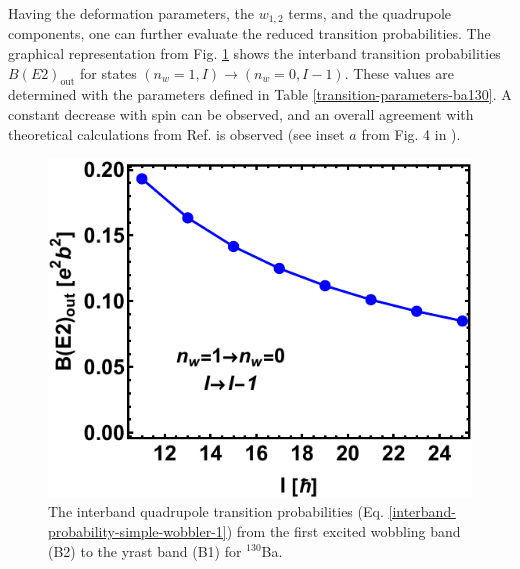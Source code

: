 Having the deformation parameters, the $w_{1,2}$ terms, and the quadrupole components, one can further evaluate the reduced transition probabilities. The graphical representation from Fig. \ref{BE2out-transitions-130ba} shows the interband transition probabilities $B(E2)_\text{out}$ for states $(n_w=1,I)\to(n_w=0,I-1)$. These values are determined with the parameters defined in Table \ref{transition-parameters-ba130}. A constant decrease with spin can be observed, and an overall agreement with theoretical calculations from Ref. \cite{chen2019transverse} is observed (see inset $a$ from Fig. 4 in \cite{chen2019transverse}).
\begin{figure}
    \centering
    \includegraphics[scale=0.8]{Chapters/Figures/BE2-out-130Ba.pdf}
    \caption{The interband quadrupole transition probabilities (Eq. \ref{interband-probability-simple-wobbler-1}) from the first excited wobbling band (B2) to the yrast band (B1) for $^{130}$Ba.}
    \label{BE2out-transitions-130ba}
\end{figure}

